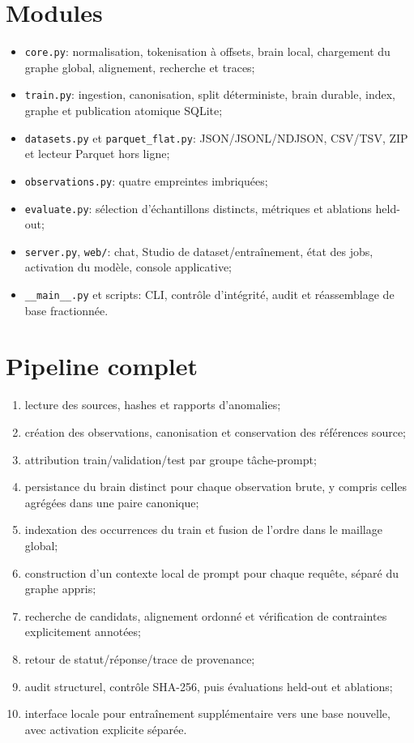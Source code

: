 \documentclass[11pt,a4paper,openany]{book}
\begin{document}
\section{Modules}
\begin{itemize}
\item \texttt{core.py}: normalisation, tokenisation à offsets, brain local, chargement du graphe global, alignement, recherche et traces;
\item \texttt{train.py}: ingestion, canonisation, split déterministe, brain durable, index, graphe et publication atomique SQLite;
\item \texttt{datasets.py} et \texttt{parquet\_flat.py}: JSON/JSONL/NDJSON, CSV/TSV, ZIP et lecteur Parquet hors ligne;
\item \texttt{observations.py}: quatre empreintes imbriquées;
\item \texttt{evaluate.py}: sélection d'échantillons distincts, métriques et ablations held-out;
\item \texttt{server.py}, \texttt{web/}: chat, Studio de dataset/entraînement, état des jobs, activation du modèle, console applicative;
\item \texttt{__main__.py} et scripts: CLI, contrôle d'intégrité, audit et réassemblage de base fractionnée.
\end{itemize}

\section{Pipeline complet}
\begin{enumerate}
\item lecture des sources, hashes et rapports d'anomalies;
\item création des observations, canonisation et conservation des références source;
\item attribution train/validation/test par groupe tâche-prompt;
\item persistance du brain distinct pour chaque observation brute, y compris celles agrégées dans une paire canonique;
\item indexation des occurrences du train et fusion de l'ordre dans le maillage global;
\item construction d'un contexte local de prompt pour chaque requête, séparé du graphe appris;
\item recherche de candidats, alignement ordonné et vérification de contraintes explicitement annotées;
\item retour de statut/réponse/trace de provenance;
\item audit structurel, contrôle SHA-256, puis évaluations held-out et ablations;
\item interface locale pour entraînement supplémentaire vers une base nouvelle, avec activation explicite séparée.
\end{enumerate}
\end{document}

